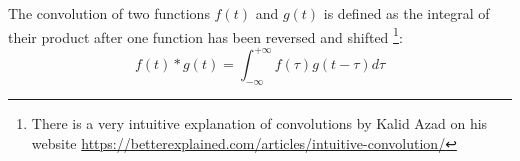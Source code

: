\begin{remark}[Convolution]
    The convolution of two functions $f(t)$ and $g(t)$ is defined as the integral of their product after one function
    has been reversed and shifted \footnote{There is a very intuitive explanation of
    convolutions by Kalid Azad on his website \url{https://betterexplained.com/articles/intuitive-convolution/}}:
    \[f(t) \ast g(t)= \int_{-\infty}^{+\infty}f(\tau)g(t-\tau) d\tau\]
%
%

\end{remark}
